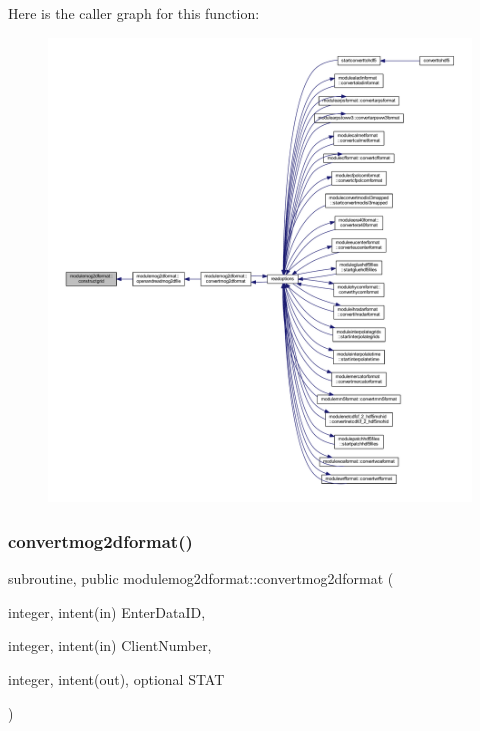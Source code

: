 Here is the caller graph for this function\+:\nopagebreak
\begin{figure}[H]
\begin{center}
\leavevmode
\includegraphics[width=350pt]{namespacemodulemog2dformat_aec84c860ca2bbc962dda260595025f58_icgraph}
\end{center}
\end{figure}
\mbox{\label{namespacemodulemog2dformat_a734bfcb7f534ab9c91af8672cea24021}} 
\subsubsection{\texorpdfstring{convertmog2dformat()}{convertmog2dformat()}}
{\footnotesize\ttfamily subroutine, public modulemog2dformat\+::convertmog2dformat (\begin{DoxyParamCaption}\item[{integer, intent(in)}]{Enter\+Data\+ID,  }\item[{integer, intent(in)}]{Client\+Number,  }\item[{integer, intent(out), optional}]{S\+T\+AT }\end{DoxyParamCaption})}

